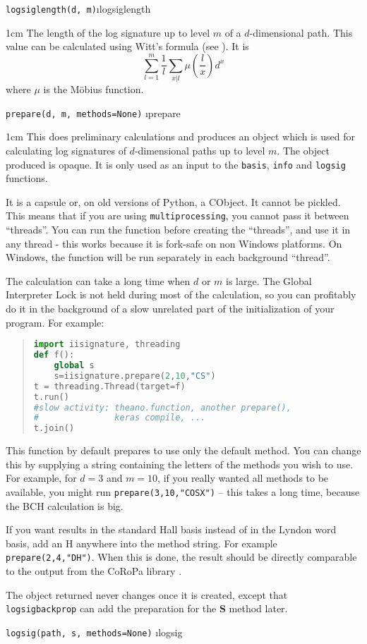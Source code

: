 \documentclass[a4paper]{extarticle}
\newenvironment{defn}{\begin{adjustwidth}{1cm}{}\ignorespaces}{\end{adjustwidth}\ignorespacesafterend}
\begin{document}
\verb!logsiglength(d, m)!\i{logsiglength}
\begin{defn}
The length of the log signature up to level $m$ of a $d$-dimensional path. This value can be calculated using Witt's formula (see \cite{wikinecklace}). It is
\[\sum_{l=1}^m \frac1l\sum_{x|l}\mu\left(\frac{l}{x}\right)d^x\]
where $\mu$ is the M\"obius function.
\end{defn}

\verb!prepare(d, m, methods=None)! \i{prepare}
\nopagebreak \begin{defn}\nopagebreak 
This does preliminary calculations and produces an object which is used for calculating log signatures of $d$-dimensional paths up to level $m$. The object produced is opaque. It is only used as an input to the \verb|basis|, \verb|info| and \verb|logsig| functions. 

It is a capsule or, on old versions of Python, a CObject. It cannot be pickled. This means that if you are using \verb|multiprocessing|, you cannot pass it between ``threads''. You can run the function before creating the ``threads'', and use it in any thread - this works because it is fork-safe on non Windows platforms. On Windows, the function will be run separately in each background ``thread''.

The calculation can take a long time when $d$ or $m$ is large. The Global Interpreter Lock is not held during most of the calculation, so you can profitably do it in the background of a slow unrelated part of the initialization of your program. For example:
\begin{quotation}
\begin{lstlisting}[language=Python,keywordstyle=\bf]
import iisignature, threading
def f():
	global s
	s=iisignature.prepare(2,10,"CS")
t = threading.Thread(target=f)
t.run()
#slow activity: theano.function, another prepare(), 
#               keras compile, ...
t.join()
\end{lstlisting}
\end{quotation}

This function by default prepares to use only the default method. You can change this by supplying a string containing the letters of the methods you wish to use. For example, for $d=3$ and $m=10$, if you really wanted all methods to be available, you might run \verb|prepare(3,10,"COSX")| -- this takes a long time, because the BCH calculation is big. 

If you want results in the standard Hall basis instead of in the Lyndon word basis, add an H anywhere into the method string. For example \verb|prepare(2,4,"DH")|. When this is done, the result should be directly comparable to the output from the CoRoPa library \cite{coropa}.

The object returned never changes once it is created, except that \verb!logsigbackprop! can add the preparation for the \textbf{S} method later.

\end{defn}
\verb!logsig(path, s, methods=None)! \i{logsig}
\end{document}
